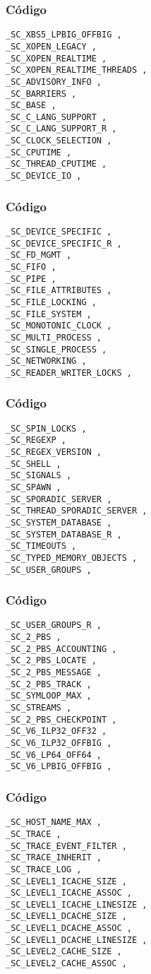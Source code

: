\documentclass{beamer}
\begin{document}
\begin{frame}[fragile]
\frametitle{C\'odigo}
\begin{verbatim}
_SC_XBS5_LPBIG_OFFBIG , 
_SC_XOPEN_LEGACY , 
_SC_XOPEN_REALTIME , 
_SC_XOPEN_REALTIME_THREADS , 
_SC_ADVISORY_INFO , 
_SC_BARRIERS , 
_SC_BASE , 
_SC_C_LANG_SUPPORT , 
_SC_C_LANG_SUPPORT_R , 
_SC_CLOCK_SELECTION , 
_SC_CPUTIME , 
_SC_THREAD_CPUTIME , 
_SC_DEVICE_IO , 
\end{verbatim}
\end{frame}
\begin{frame}[fragile]
\frametitle{C\'odigo}
\begin{verbatim}
_SC_DEVICE_SPECIFIC , 
_SC_DEVICE_SPECIFIC_R , 
_SC_FD_MGMT , 
_SC_FIFO , 
_SC_PIPE , 
_SC_FILE_ATTRIBUTES , 
_SC_FILE_LOCKING , 
_SC_FILE_SYSTEM , 
_SC_MONOTONIC_CLOCK , 
_SC_MULTI_PROCESS , 
_SC_SINGLE_PROCESS , 
_SC_NETWORKING , 
_SC_READER_WRITER_LOCKS , 
\end{verbatim}
\end{frame}
\begin{frame}[fragile]
\frametitle{C\'odigo}
\begin{verbatim}
_SC_SPIN_LOCKS , 
_SC_REGEXP , 
_SC_REGEX_VERSION , 
_SC_SHELL , 
_SC_SIGNALS , 
_SC_SPAWN , 
_SC_SPORADIC_SERVER , 
_SC_THREAD_SPORADIC_SERVER , 
_SC_SYSTEM_DATABASE , 
_SC_SYSTEM_DATABASE_R , 
_SC_TIMEOUTS , 
_SC_TYPED_MEMORY_OBJECTS , 
_SC_USER_GROUPS , 
\end{verbatim}
\end{frame}
\begin{frame}[fragile]
\frametitle{C\'odigo}
\begin{verbatim}
_SC_USER_GROUPS_R , 
_SC_2_PBS , 
_SC_2_PBS_ACCOUNTING , 
_SC_2_PBS_LOCATE , 
_SC_2_PBS_MESSAGE , 
_SC_2_PBS_TRACK , 
_SC_SYMLOOP_MAX , 
_SC_STREAMS , 
_SC_2_PBS_CHECKPOINT , 
_SC_V6_ILP32_OFF32 , 
_SC_V6_ILP32_OFFBIG , 
_SC_V6_LP64_OFF64 , 
_SC_V6_LPBIG_OFFBIG , 
\end{verbatim}
\end{frame}
\begin{frame}[fragile]
\frametitle{C\'odigo}
\begin{verbatim}
_SC_HOST_NAME_MAX , 
_SC_TRACE , 
_SC_TRACE_EVENT_FILTER , 
_SC_TRACE_INHERIT , 
_SC_TRACE_LOG , 
_SC_LEVEL1_ICACHE_SIZE , 
_SC_LEVEL1_ICACHE_ASSOC , 
_SC_LEVEL1_ICACHE_LINESIZE , 
_SC_LEVEL1_DCACHE_SIZE , 
_SC_LEVEL1_DCACHE_ASSOC , 
_SC_LEVEL1_DCACHE_LINESIZE , 
_SC_LEVEL2_CACHE_SIZE , 
_SC_LEVEL2_CACHE_ASSOC , 
\end{verbatim}
\end{frame}
\end{document}
